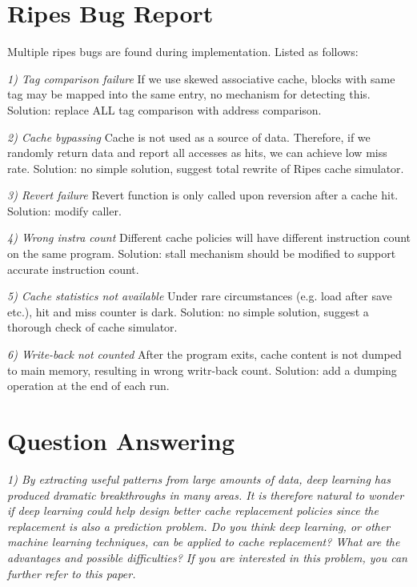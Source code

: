 \documentclass[utf8]{article}
\begin{document}

\section{Ripes Bug Report}
Multiple ripes bugs are found during implementation. Listed as follows:

\noindent
\emph{1) Tag comparison failure } If we use skewed associative cache, blocks with same tag may be mapped into the same entry, no mechanism for detecting this. Solution: replace ALL tag comparison with address comparison.

\noindent
\emph{2) Cache bypassing } Cache is not used as a source of data. Therefore, if we randomly return data and report all accesses as hits, we can achieve low miss rate. Solution: no simple solution, suggest total rewrite of Ripes cache simulator.

\noindent
\emph{3) Revert failure } Revert function is only called upon reversion after a cache hit. Solution: modify caller.

\noindent
\emph{4) Wrong instra count } Different cache policies will have different instruction count on the same program. Solution: stall mechanism should be modified to support accurate instruction count.

\noindent
\emph{5) Cache statistics not available} Under rare circumstances (e.g. load after save etc.), hit and miss counter is dark. Solution: no simple solution, suggest a thorough check of cache simulator.

\noindent
\emph{6) Write-back not counted} After the program exits, cache content is not dumped to main memory, resulting in wrong writr-back count. Solution: add a dumping operation at the end of each run. 

\newpage
\section{Question Answering}
\noindent
\emph{1) By extracting useful patterns from large amounts of data, deep learning has produced
	dramatic breakthroughs in many areas. It is therefore natural to wonder if deep learning
	could help design better cache replacement policies since the replacement is also a
	prediction problem. Do you think deep learning, or other machine learning techniques, can
	be applied to cache replacement? What are the advantages and possible difficulties? If you
	are interested in this problem, you can further refer to this paper.}
\end{document}
